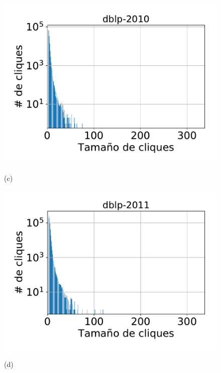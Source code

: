 \begin{figure}
{    	\begin{minipage}{1\textwidth}
    		\centering
    		\begin{minipage}{0.45\textwidth}
    			\centering
    			\includegraphics[width=1\linewidth]{img/cliqueDist2/dblp-2010.pdf}
    			
    			(c)
    		\end{minipage}
    		\begin{minipage}{0.45\textwidth}
    			\centering
    			\includegraphics[width=1\linewidth]{img/cliqueDist2/dblp-2011.pdf}
    			
    			(d)
    		\end{minipage}  
    	\end{minipage}
    	
}
\end{figure}
